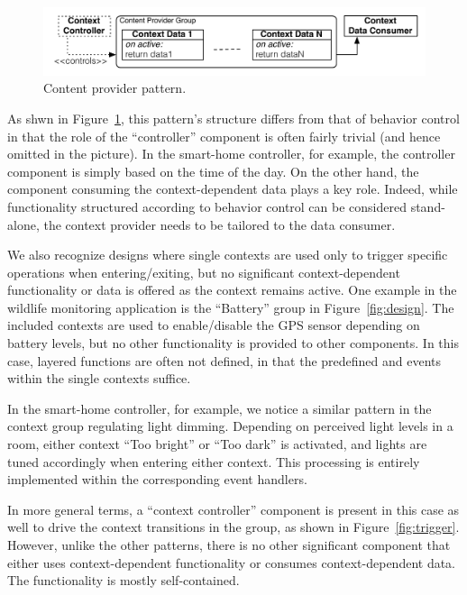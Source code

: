 \begin{figure}[tb]
\begin{center}
\includegraphics[scale=.5]{imgs/content_provider}
\vspace{-6mm}
\caption{Content provider pattern.}
  \label{fig:provider}
\vspace{-6mm}
\end{center}
\end{figure}

As shwn in Figure~\ref{fig:provider}, this pattern's structure differs
from that of behavior control in that the role of the ``controller''
component is often fairly trivial (and hence omitted in the
picture). In the smart-home controller, for example, the controller
component is simply based on the time of the day. On the other hand,
the component consuming the context-dependent data plays a key
role. Indeed, while functionality structured according to behavior
control can be considered stand-alone, the context provider needs to
be tailored to the data consumer.

 We also recognize designs where single contexts are
used only to trigger specific operations when entering/exiting, but no
significant context-dependent functionality or data is offered as the
context remains active. One example in the wildlife monitoring
application is the ``Battery'' group in Figure~\ref{fig:design}. The
included contexts are used to enable/disable the GPS sensor depending
on battery levels, but no other functionality is provided to other
components. In this case, layered functions are often not defined, in
that the predefined  and  events
within the single contexts suffice.

In the smart-home controller, for example, we notice a similar pattern
in the context group regulating light dimming. Depending on
perceived light levels in a room, either context ``Too bright'' or
``Too dark'' is activated, and lights are tuned accordingly when
entering either context. This processing is entirely implemented
within the corresponding  event handlers. 

In more general terms, a ``context controller'' component is present
in this case as well to drive the context transitions in the group, as
shown in Figure~\ref{fig:trigger}. However, unlike the other patterns,
there is no other significant component that either uses
context-dependent functionality or consumes context-dependent
data. The functionality is mostly self-contained.

